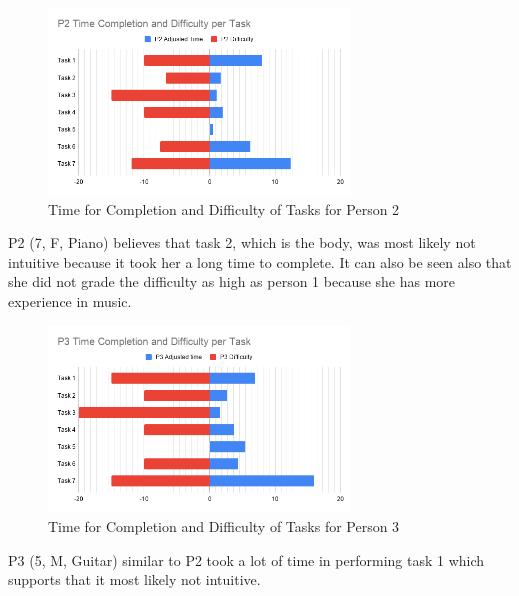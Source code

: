 \begin{figure}[H]
    \centering
    \includegraphics[width=8cm]{figures/NewFigures/P2.png}
    \caption{Time for Completion and Difficulty of Tasks for Person 2}
    \label{fig:P2Timing}
\end{figure}
P2 (7, F, Piano) believes that task 2, which is the body, was most likely not intuitive because it took her a long time to complete. It can also be seen also that she did not grade the difficulty as high as person 1 because she has more experience in music.

\begin{figure}[H]
    \centering
    \includegraphics[width=8cm]{figures/NewFigures/P3.png}
    \caption{Time for Completion and Difficulty of Tasks for Person 3}
    \label{fig:P3Timing}
\end{figure}
P3 (5, M, Guitar) similar to P2 took a lot of time in performing task 1 which supports that it most likely not intuitive.



